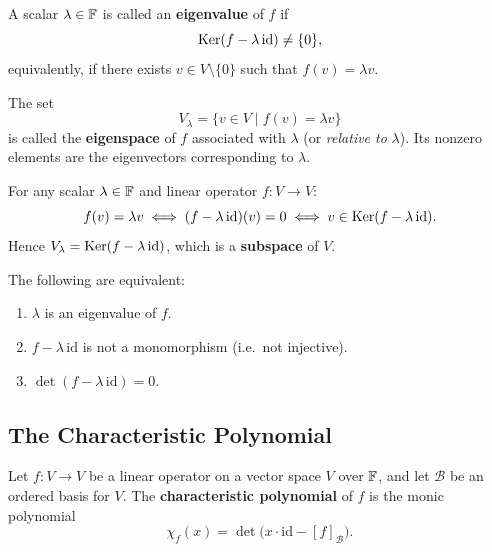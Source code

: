 \begin{defbox}
\label{def:eigenvalue-eigenspace}
A scalar $\lambda\in\mathbb{F}$ is called an \textbf{eigenvalue} of $f$ if
\[
    \operatorname{Ker}(f - \lambda\,\mathrm{id}) \neq \{0\},
\]
equivalently, if there exists $v\in V\setminus\{0\}$ such that
$f(v)=\lambda v$.

The set
\[
    V_\lambda = \{v\in V \mid f(v)=\lambda v\}
\]
is called the \textbf{eigenspace} of $f$ associated with $\lambda$
(or \emph{relative to} $\lambda$).  Its nonzero elements are the
eigenvectors corresponding to $\lambda$.
\end{defbox}

\begin{tipbox}
For any scalar $\lambda\in\mathbb{F}$ and linear operator $f:V\to V$:
\[
    f(v)=\lambda v
    \;\Longleftrightarrow\;
    (f-\lambda\,\mathrm{id})(v)=0
    \;\Longleftrightarrow\;
    v\in\operatorname{Ker}(f-\lambda\,\mathrm{id}).
\]
Hence $V_\lambda = \operatorname{Ker}(f-\lambda\,\mathrm{id})$, which is a
\textbf{subspace} of $V$.
\end{tipbox}

\begin{thmbox}
\label{thm:eigenvalue-conditions}
The following are equivalent:
\begin{enumerate}[label=\textbf{(\roman*)}]
    \item $\lambda$ is an eigenvalue of $f$.
    \item $f-\lambda\,\mathrm{id}$ is not a monomorphism (i.e.\ not injective).
    \item $\det(f-\lambda\,\mathrm{id})=0$.
\end{enumerate}
\end{thmbox}

\subsection{The Characteristic Polynomial}

\begin{defbox}
\label{def:char-poly}
Let $f:V\to V$ be a linear operator on a vector space $V$ over $\mathbb{F}$, and
let $\mathcal{B}$ be an ordered basis for $V$.  The \textbf{characteristic
polynomial} of $f$ is the monic polynomial
\[
    \chi_f(x) = \det\!\bigl(x\cdot\mathrm{id} - [f]_{\mathcal{B}}\bigr).
\]
\end{defbox}

